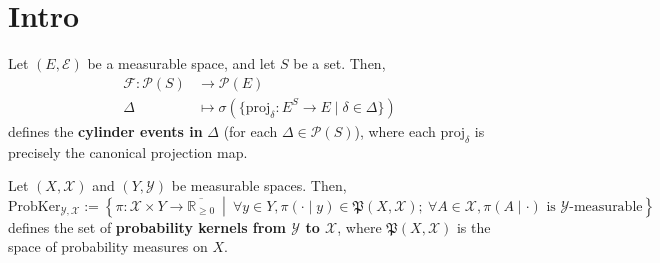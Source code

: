 %

\chapter{Intro}

\begin{definition}
    \label{def:cylinderEventsIn}
    \leanok
    Let $(E,\mathcal{E})$ be a measurable space, and let $S$ be a set. Then,
    \begin{align*}
        \mathcal{F}:\mathcal{P}(S)&\to\mathcal{P}(E)\\
        \Delta&\mapsto \sigma(\{\text{proj}_\delta:E^S\to E\mid \delta\in \Delta\})
    \end{align*}
    defines the \textbf{cylinder events in }$\Delta$ (for each $\Delta\in\mathcal{P}(S)$), where each $\text{proj}_\delta$ is precisely the canonical projection map.
\end{definition}

\begin{definition}
    \label{def:probabilityKernel}
    \leanok
    Let $(X,\mathcal{X})$ and $(Y,\mathcal{Y})$ be measurable spaces. Then,
    \begin{equation*}
        \text{ProbKer}_{\mathcal{Y},\mathcal{X}}:=\left\{\pi:\mathcal{X}\times Y\to\overline{\mathbb{R}_{\geq0}}~\middle\vert~ \forall y\in Y,\pi(\cdot\mid y)\in\mathfrak{P}(X,\mathcal{X});~\forall A\in\mathcal{X},\pi(A\mid\cdot)\text{ is }\mathcal{Y}\text{-measurable}\right\}
    \end{equation*}
    defines the set of \textbf{probability kernels from $\mathcal{Y}$ to $\mathcal{X}$}, where $\mathfrak{P}(X,\mathcal{X})$ is the space of probability measures on $X$.
\end{definition}

